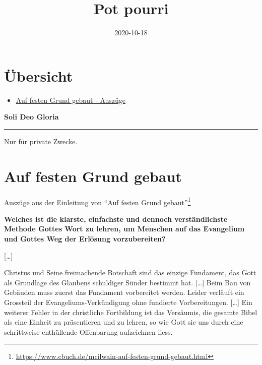 \documentclass[
  12pt,
]{krantz}
\title{Pot pourri}
\author{}
\date{\vspace{-2.5em}2020-10-18}
\makeatletter
\providecommand{\tightlist}{%
  \setlength{\itemsep}{0pt}\setlength{\parskip}{0pt}}
\newenvironment{kframe}{%
\medskip{}
\setlength{\fboxsep}{.8em}
 \def\at@end@of@kframe{}%
 \ifinner\ifhmode%
  \def\at@end@of@kframe{\end{minipage}}%
  \begin{minipage}{\columnwidth}%
 \fi\fi%
 \def\FrameCommand##1{\hskip\@totalleftmargin \hskip-\fboxsep
 \colorbox{shadecolor}{##1}\hskip-\fboxsep
     \hskip-\linewidth \hskip-\@totalleftmargin \hskip\columnwidth}%
 \MakeFramed {\advance\hsize-\width
   \@totalleftmargin\z@ \linewidth\hsize
   \@setminipage}}%
 {\par\unskip\endMakeFramed%
 \at@end@of@kframe}
\newenvironment{rmdblock}[1]
  {
  \begin{itemize}
  \renewcommand{\labelitemi}{
    \raisebox{-.7\height}[0pt][0pt]{
      {\setkeys{Gin}{width=3em,keepaspectratio}\texttt{[image: img/\#1]}}
    }
  }
  \setlength{\fboxsep}{1em}
  \begin{kframe}
  \item
  }
  {
  \end{kframe}
  \end{itemize}
  }
\newenvironment{rmdinfo}
  {\begin{rmdblock}{caution}}
  {\end{rmdblock}}
\renewcommand{\href}[2]{#2\footnote{\url{#1}}}
\makeatother
\begin{document}
\maketitle

\thispagestyle{empty}
\mainmatter

{
\hypersetup{linkcolor=}
\setcounter{tocdepth}{2}
\tableofcontents
}
\hypertarget{ubersicht}{%
\chapter*{Übersicht}\label{ubersicht}}


\begin{itemize}
\tightlist
\item
  \protect\hyperlink{auf-festen-grund-gebaut}{Auf festen Grund gebaut - Auszüge}
\end{itemize}

\begin{rmdinfo}
\textbf{Soli Deo Gloria}
\end{rmdinfo}

\begin{center}\rule{0.5\linewidth}{0.5pt}\end{center}

Nur für private Zwecke.

\hypertarget{auf-festen-grund-gebaut}{%
\chapter*{Auf festen Grund gebaut}\label{auf-festen-grund-gebaut}}


Auszüge aus der Einleitung von \href{https://www.cbuch.de/mcilwain-auf-festen-grund-gebaut.html}{``Auf festen Grund gebaut''}

\textbf{Welches ist die klarste, einfachste und dennoch verständlichste Methode
Gottes Wort zu lehren, um Menschen auf das Evangelium und Gottes Weg der
Erlösung vorzubereiten?}

{[}\ldots{]}

Christus und Seine freimachende Botschaft sind das einzige Fundament, das
Gott als Grundlage des Glaubens schuldiger Sünder bestimmt hat. {[}\ldots{]} Beim Bau
von Gebäuden muss zuerst das Fundament vorbereitet werden. Leider verläuft
ein Grossteil der Evangeliums-Verkündigung ohne fundierte Vorbereitungen. {[}\ldots{]}
Ein weiterer Fehler in der christliche Fortbildung ist das Versäumis, die
gesamte Bibel als eine Einheit zu präsentieren und zu lehren, so wie Gott
sie uns durch eine schrittweise enthüllende Offenbarung aufzeichnen liess.
\end{document}
